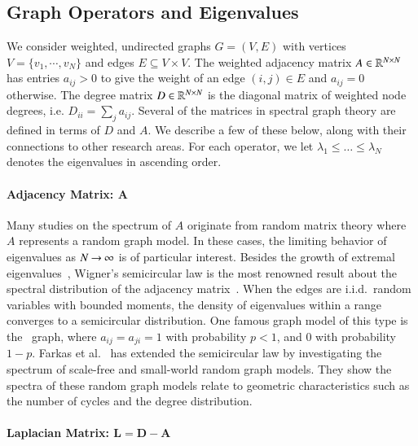 \subsection{Graph Operators and Eigenvalues}

We consider weighted, undirected graphs $G = (V, E)$ with vertices $V=
\{v_1,\cdots, v_N\}$ and edges $E \subseteq V \times V$. The weighted adjacency
matrix $A\in\mathbb{R}^{N\times N}$ has entries $a_{ij} > 0$ to give the weight of an
edge $(i,j) \in E$ and $a_{ij} = 0$ otherwise. The degree matrix $D\in\mathbb{R}^
{N\times N}$ is the diagonal matrix of weighted node degrees, i.e. $D_{ii} =
\sum_j a_{ij}$. Several of the matrices in spectral graph theory are defined in
terms of $D$ and $A$.  We describe a few of these below, along with their
connections to other research areas. For each operator, we let $\lambda_1 \leq
\ldots \leq \lambda_N$ denotes the eigenvalues in ascending order.

\paragraph{Adjacency Matrix: $\pmb{A}$}

Many studies on the spectrum of $A$ originate from random matrix theory where
$A$ represents a random graph model. In these cases, the limiting behavior of
eigenvalues as $N\mathbin{\to}\infty$ is of particular interest. Besides the growth of
extremal eigenvalues~\cite{chung1997spectral}, Wigner's semicircular law is 
the most renowned result about the spectral distribution of the adjacency
matrix~\cite{wigner1958distribution}. When the edges are i.i.d.~random variables
with bounded moments, the density of eigenvalues within a range converges to a
semicircular distribution. One famous graph model of this type is the
\ErdosRenyi\ graph, where $a_{ij} = a_{ji} = 1$ with probability $p < 1$, and
$0$ with probability $1-p$. Farkas et al.~\cite{farkas2001spectra} has extended
the semicircular law by investigating the spectrum of scale-free and small-world
random graph models. They show the spectra of these random graph models relate
to geometric characteristics such as the number of cycles and the degree
distribution.

\paragraph{Laplacian Matrix: $\pmb{L = D - A}$}

